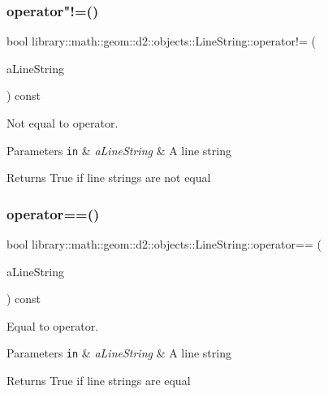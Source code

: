 \subsubsection{\texorpdfstring{operator"!=()}{operator!=()}}
{\footnotesize\ttfamily bool library\+::math\+::geom\+::d2\+::objects\+::\+Line\+String\+::operator!= (\begin{DoxyParamCaption}\item[{const \hyperlink{classlibrary_1_1math_1_1geom_1_1d2_1_1objects_1_1_line_string}{Line\+String} \&}]{a\+Line\+String }\end{DoxyParamCaption}) const}



Not equal to operator. 


\begin{DoxyParams}[1]{Parameters}
\mbox{\tt in}  & {\em a\+Line\+String} & A line string \\
\hline
\end{DoxyParams}
\begin{DoxyReturn}{Returns}
True if line strings are not equal 
\end{DoxyReturn}
\mbox{\label{classlibrary_1_1math_1_1geom_1_1d2_1_1objects_1_1_line_string_a9243f1af02509aa7053d5e8ed3a4223c}} 
\subsubsection{\texorpdfstring{operator==()}{operator==()}}
{\footnotesize\ttfamily bool library\+::math\+::geom\+::d2\+::objects\+::\+Line\+String\+::operator== (\begin{DoxyParamCaption}\item[{const \hyperlink{classlibrary_1_1math_1_1geom_1_1d2_1_1objects_1_1_line_string}{Line\+String} \&}]{a\+Line\+String }\end{DoxyParamCaption}) const}



Equal to operator. 


\begin{DoxyParams}[1]{Parameters}
\mbox{\tt in}  & {\em a\+Line\+String} & A line string \\
\hline
\end{DoxyParams}
\begin{DoxyReturn}{Returns}
True if line strings are equal 
\end{DoxyReturn}
\mbox{\label{classlibrary_1_1math_1_1geom_1_1d2_1_1objects_1_1_line_string_ae980ac86d1f2d8091151252aef2b6adc}} 
